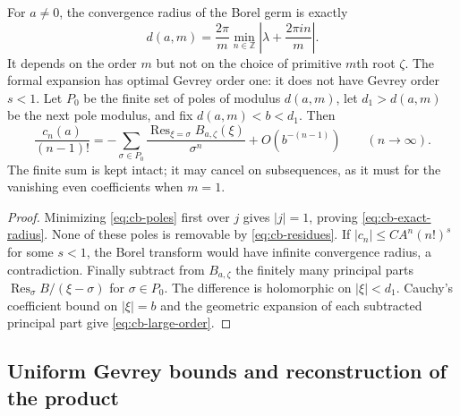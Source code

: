 \begin{corollary}
\label{cor:cb-large-order}
For $a\ne0$, the convergence radius of the Borel germ is exactly
\begin{equation}
 d(a,m)=\frac{2\pi}{m}
        \min_{n\in\mathbb Z}\left|\lambda+\frac{2\pi i n}{m}\right|.
 \label{eq:cb-exact-radius}
\end{equation}
It depends on the order $m$ but not on the choice of primitive $m$th
root $\zeta$.  The formal expansion has optimal Gevrey order one: it
does not have Gevrey order $s<1$.
Let $P_0$ be the finite set of poles of modulus $d(a,m)$, let $d_1>d(a,m)$
be the next pole modulus, and fix $d(a,m)<b<d_1$.  Then
\begin{equation}
 \frac{c_n(a)}{(n-1)!}
 =-\sum_{\sigma\in P_0}
       \frac{\operatorname{Res}_{\xi=\sigma}B_{a,\zeta}(\xi)}{\sigma^n}
   +O\!\left(b^{-(n-1)}\right)
 \qquad(n\to\infty).
 \label{eq:cb-large-order}
\end{equation}
The finite sum is kept intact; it may cancel on subsequences, as it must
for the vanishing even coefficients when $m=1$.
\end{corollary}

\begin{proof}
Minimizing \eqref{eq:cb-poles} first over $j$ gives $|j|=1$, proving
\eqref{eq:cb-exact-radius}.  None of these poles is removable by
\eqref{eq:cb-residues}.  If $|c_n|\leq CA^n(n!)^s$ for some $s<1$,
the Borel transform would have infinite convergence radius, a
contradiction.  Finally subtract from $B_{a,\zeta}$ the finitely many
principal parts $\operatorname{Res}_{\sigma}B/(\xi-\sigma)$ for
$\sigma\in P_0$.  The difference is holomorphic on $|\xi|<d_1$.
Cauchy's coefficient bound on $|\xi|=b$ and the geometric expansion of
each subtracted principal part give \eqref{eq:cb-large-order}.
\end{proof}

\subsection{Uniform Gevrey bounds and reconstruction of the product}

